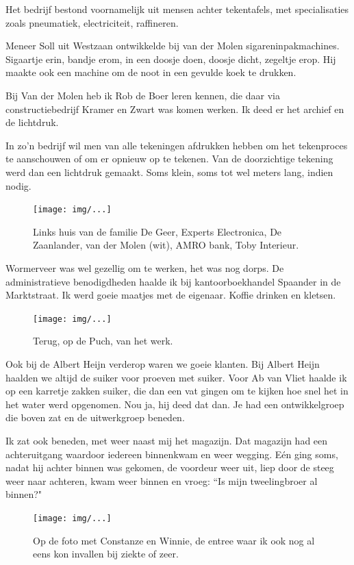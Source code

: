 \documentclass[12pt,twoside, openright]{memoir}
\begin{document}
Het bedrijf bestond voornamelijk uit mensen achter tekentafels, met specialisaties zoals pneumatiek, electriciteit, raffineren.

Meneer Soll uit Westzaan ontwikkelde bij van der Molen  sigareninpakmachines. Sigaartje erin, bandje erom, in een doosje doen, doosje dicht, zegeltje erop. Hij maakte ook een machine om de noot in een gevulde koek te drukken. 

Bij Van der Molen heb ik Rob de Boer leren kennen, die daar via constructiebedrijf Kramer en Zwart was komen werken. Ik deed er het archief en de lichtdruk. 

In zo'n bedrijf wil men van alle tekeningen afdrukken hebben om het tekenproces te aanschouwen of om er opnieuw op te tekenen. Van de doorzichtige tekening werd dan een lichtdruk gemaakt. Soms klein, soms tot wel meters lang, indien nodig. 

\begin{figure}[t]
\texttt{[image: img/...]}
\caption{Links huis van de familie De Geer, Experts Electronica, De Zaanlander, van der Molen (wit), AMRO bank, Toby Interieur.}
\end{figure}

Wormerveer was wel gezellig om te werken, het was nog dorps. De administratieve benodigdheden haalde ik bij kantoorboekhandel Spaander in de Marktstraat. Ik werd goeie maatjes met de eigenaar. Koffie drinken en kletsen. 

\begin{figure}[t]
\texttt{[image: img/...]}
\caption{Terug, op de Puch, van het werk.}
\end{figure}

Ook bij de Albert Heijn verderop waren we goeie klanten. Bij Albert Heijn haalden we altijd de suiker voor proeven met suiker. Voor Ab van Vliet haalde ik op een karretje zakken suiker, die dan een vat gingen om te kijken hoe snel het in het water werd opgenomen. Nou ja, hij deed dat dan. Je had een ontwikkelgroep die boven zat en de uitwerkgroep beneden. 

Ik zat ook beneden, met weer naast mij het magazijn. Dat magazijn had een achteruitgang waardoor iedereen binnenkwam en weer wegging. Eén ging soms, nadat hij achter binnen was gekomen, de voordeur weer uit, liep door de steeg weer naar achteren, kwam weer binnen en vroeg: ``Is mijn tweelingbroer al binnen?"

\begin{figure}[t]
\texttt{[image: img/...]}
\caption{Op de foto met Constanze en Winnie, de entree waar ik ook nog al eens kon invallen bij ziekte of zeer.}
\end{figure}
\end{document}
